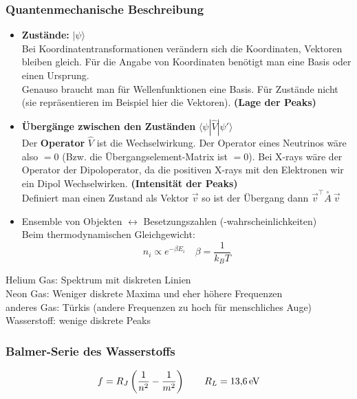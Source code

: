 \subsubsection{Quantenmechanische Beschreibung}

\begin{itemize}
	\item \textbf{Zustände:} $ |\psi \rangle $\\
	Bei Koordinatentransformationen verändern sich die Koordinaten, Vektoren bleiben gleich. Für die Angabe von Koordinaten benötigt man eine Basis oder einen Ursprung.\\
	Genauso braucht man für Wellenfunktionen eine Basis. Für Zustände nicht (sie repräsentieren im Beispiel hier die Vektoren). \textbf{(Lage der Peaks)}
	\item \textbf{Übergänge zwischen den Zuständen} $ \langle \psi | \hat{V} | \psi'\rangle $\\
	Der \textbf{Operator} $ \hat{V} $ ist die Wechselwirkung. Der Operator eines Neutrinos wäre also $ = 0 $ (Bzw. die Übergangselement-Matrix ist $ = 0 $). Bei X-rays wäre der Operator der Dipoloperator, da die positiven X-rays mit den Elektronen wir ein Dipol Wechselwirken. \textbf{(Intensität der Peaks)}\\
	Definiert man einen Zustand als Vektor $ \vec{v} $ so ist der Übergang dann $ \vec{v}^\top \overset{\circ}{A}\ \vec{v} $
	\item Ensemble von Objekten $ \leftrightarrow $ Besetzungszahlen (-wahrscheinlichkeiten) \\
	Beim thermodynamischen Gleichgewicht:
	\begin{equation*}
	n_i \propto e^{- \beta E_i} \quad \beta = \frac{1}{k_B T}
	\end{equation*}
\end{itemize}
Helium Gas: Spektrum mit diskreten Linien\\
Neon Gas: Weniger diskrete Maxima und eher höhere Frequenzen\\
anderes Gas: Türkis (andere Frequenzen zu hoch für menschliches Auge)\\
Wasserstoff: wenige diskrete Peaks

\subsubsection{Balmer-Serie des Wasserstoffs}

\begin{equation*}
f = R_J\left(\frac{1}{n^2} - \frac{1}{m^2}\right) \qquad R_L = 13{,}6 \, \textrm{eV}
\end{equation*}

